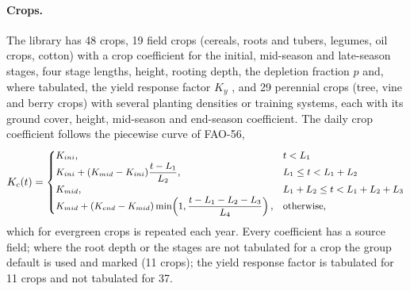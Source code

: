 \paragraph{Crops.}
The library has 48 crops, 19 field crops (cereals, roots and tubers, legumes, oil crops, cotton) with a crop coefficient for the initial, mid-season and late-season stages, four stage lengths, height, rooting depth, the depletion fraction $p$ and, where tabulated, the yield response factor $K_y$ \citep{Doorenbos1979,Allen1998}, and 29 perennial crops (tree, vine and berry crops) with several planting densities or training systems, each with its ground cover, height, mid-season and end-season coefficient. The daily crop coefficient follows the piecewise curve of FAO-56,
\begin{equation}\label{eq:kc}
\small K_c(t)=\begin{cases}K_{ini}, & t<L_1\\ K_{ini}+(K_{mid}-K_{ini})\dfrac{t-L_1}{L_2}, & L_1\le t<L_1+L_2\\ K_{mid}, & L_1+L_2\le t<L_1+L_2+L_3\\ K_{mid}+(K_{end}-K_{mid})\min\!\left(1,\dfrac{t-L_1-L_2-L_3}{L_4}\right), & \text{otherwise,}\end{cases}
\end{equation}
which for evergreen crops is repeated each year. Every coefficient has a source field; where the root depth or the stages are not tabulated for a crop the group default is used and marked (11 crops); the yield response factor is tabulated for 11 crops and not tabulated for 37.


